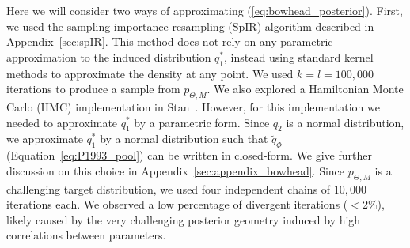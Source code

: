 \documentclass[12pt]{article}
\begin{document}
Here we will consider two ways of approximating (\ref{eq:bowhead_posterior}).
First, we used the sampling importance-resampling (SpIR) algorithm described in Appendix~\ref{sec:spIR}.
This method does not rely on any parametric approximation to the induced distribution $q_1^\ast$, instead using standard kernel methods to approximate the density at any point.
We used $k = l = 100, 000$ iterations to produce a sample from $p_{\Theta, M}$.
We also explored a Hamiltonian Monte Carlo (HMC) implementation in Stan~\parencite{Carpenter2017}.
However, for this implementation we needed to approximate $q_1^\ast$ by a parametric form.
Since $q_2$ is a normal distribution, we approximate $q_1^\ast$ by a normal distribution such that $\tilde{q}_{\Phi}$ (Equation~\ref{eq:P1993_pool}) can be written in closed-form.
We give further discussion on this choice in Appendix~\ref{sec:appendix_bowhead}.
Since $p_{\Theta, M}$ is a challenging target distribution, we used four independent chains of  $10,000$ iterations each.
We observed a low percentage of divergent iterations ($<$2\%), likely caused by the very challenging posterior geometry induced by high correlations between parameters.
\end{document}
